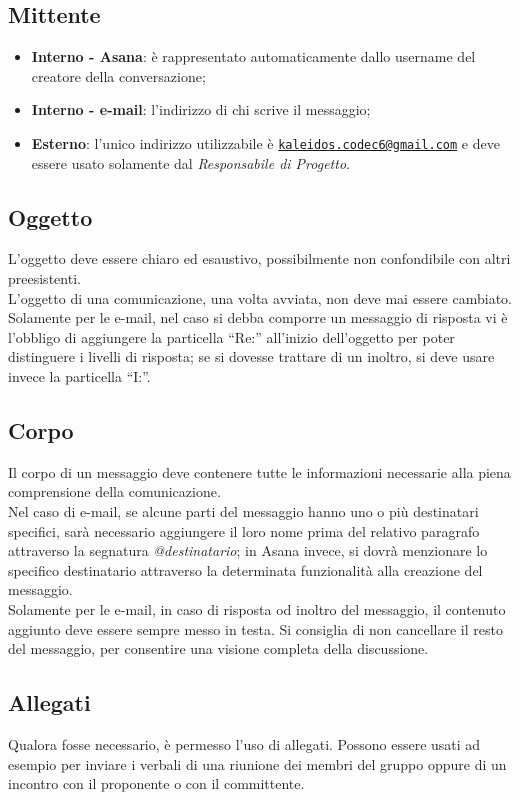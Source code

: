 \documentclass[a4paper]{report}
\newcommand{\mail}[1]{\href{mailto:#1}{\texttt{#1}}}	%
\begin{document}
		\subsection{Mittente}
			\begin{itemize}
			\item\textbf{Interno - Asana}: è rappresentato automaticamente
			dallo username del creatore della conversazione;
			\item\textbf{Interno - e-mail}: l'indirizzo di chi scrive
			il messaggio;
			\item\textbf{Esterno}: l'unico indirizzo utilizzabile è
			\mail{kaleidos.codec6@gmail.com} e deve essere usato solamente dal
			\textit{Responsabile di Progetto}.
			\end{itemize}
		\subsection{Oggetto}
			L'oggetto deve essere chiaro ed esaustivo, possibilmente non
			confondibile con altri preesistenti.\\
			L'oggetto di una comunicazione,
			una volta avviata, non deve mai essere cambiato.\\
			Solamente per le e-mail, nel caso si debba
			comporre un messaggio di risposta vi è l'obbligo di aggiungere la
			particella ``Re:'' all'inizio dell'oggetto per poter distinguere i
			livelli di risposta; se si dovesse trattare di un inoltro, si deve
			usare invece la particella ``I:''.
		\subsection{Corpo}
			Il corpo di un messaggio deve contenere tutte le informazioni
			necessarie alla piena comprensione della comunicazione.\\
			Nel caso di e-mail, se alcune parti del messaggio hanno uno o più
			destinatari specifici,
			sarà necessario aggiungere il loro nome	prima del relativo paragrafo
			attraverso la segnatura	\textit{@destinatario};
			in Asana invece, si dovrà menzionare lo specifico destinatario
			attraverso la determinata funzionalità alla creazione del messaggio.
			\\Solamente per le e-mail, in caso di risposta od inoltro del
			messaggio, il contenuto aggiunto deve essere sempre messo in testa.
			Si consiglia di non cancellare il resto del messaggio,
			per consentire una visione completa della discussione.
		\subsection{Allegati}
			Qualora fosse necessario, è permesso l'uso di allegati. Possono
			essere usati ad esempio per inviare i verbali di una riunione dei
			membri del gruppo oppure di un incontro con il proponente o con
			il committente.
	
\end{document}
